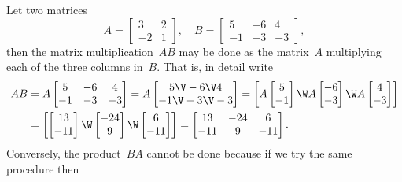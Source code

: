 \begin{example} 
Let two matrices
\begin{equation*}
A=\begin{bmatrix} 3 & 2\\ -2 & 1 \end{bmatrix},\quad
B=\begin{bmatrix} 5 & -6 & 4\\ -1 & -3 & -3 \end{bmatrix},
\end{equation*}
then the matrix multiplication~\(AB\) may be done as the matrix~\(A\) multiplying each of the three columns in~\(B\).
That is, in detail write
\begin{align*}
AB&=A\begin{bmatrix} 5 & -6 & 4\\ -1 & -3 & -3 \end{bmatrix}
=A\begin{bmatrix} 5 \V -6 \V 4\\ -1 \V -3 \V -3 \end{bmatrix}
=\begin{bmatrix} A\begin{bmatrix} 5\\-1 \end{bmatrix} \W
A\begin{bmatrix} -6\\-3 \end{bmatrix} \W
A\begin{bmatrix} 4\\-3 \end{bmatrix} \end{bmatrix}
\\&=\begin{bmatrix} \begin{bmatrix} 13\\-11 \end{bmatrix} \W
\begin{bmatrix} -24\\9 \end{bmatrix} \W
\begin{bmatrix}6\\-11 \end{bmatrix} \end{bmatrix}
=\begin{bmatrix}  13& -24&6\\-11 &9&-11\end{bmatrix}.
\end{align*}
Conversely, the product~\(BA\) cannot be done because if we try the same procedure then

\end{example}
